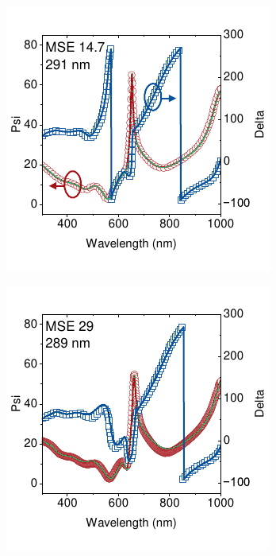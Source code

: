 \begin{figure}[t]
    \centering
    \begin{subfigure}[t]{0.4\textwidth}
        \centering
        \includegraphics[width=\textwidth]{chapters/ellipsometry/image/t0_plot.pdf} %
        \caption{}
        \label{fig:ellipsometry:static_fits:t0}
    \end{subfigure}
    \hspace{1cm}
    \begin{subfigure}[t]{0.4\textwidth}
        \centering
        \includegraphics[width=\textwidth]{chapters/ellipsometry/image/t23_fixed_thickness_50_v.pdf} 

\end{subfigure}
\end{figure}
